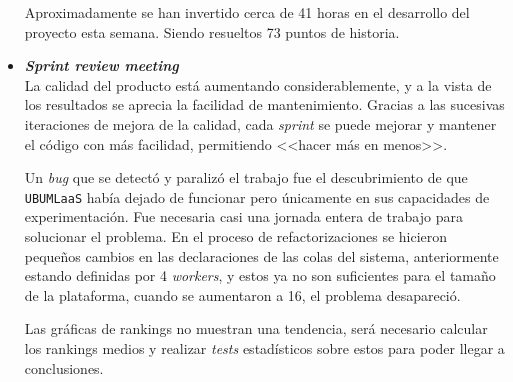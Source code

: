 \begin{itemize}
Aproximadamente se han invertido cerca de 41 horas en el desarrollo del proyecto esta semana. Siendo resueltos 73 puntos de historia.

\item \textbf{\textit{Sprint review meeting}}\\
La calidad del producto está aumentando considerablemente, y a la vista de los resultados se aprecia la facilidad de mantenimiento. Gracias a las sucesivas iteraciones de mejora de la calidad, cada \textit{sprint} se puede mejorar y mantener el código con más facilidad, permitiendo <<hacer más en menos>>.

Un \textit{bug} que se detectó y paralizó el trabajo fue el descubrimiento de que \texttt{UBUMLaaS} había dejado de funcionar pero únicamente en sus capacidades de experimentación. Fue necesaria casi una jornada entera de trabajo para solucionar el problema. En el proceso de refactorizaciones se hicieron pequeños cambios en las declaraciones de las colas del sistema, anteriormente estando definidas por 4 \textit{workers}, y estos ya no son suficientes para el tamaño de la plataforma, cuando se aumentaron a 16, el problema desapareció.

Las gráficas de rankings no muestran una tendencia, será necesario calcular los rankings medios y realizar \textit{tests} estadísticos sobre estos para poder llegar a conclusiones.
\end{itemize}

